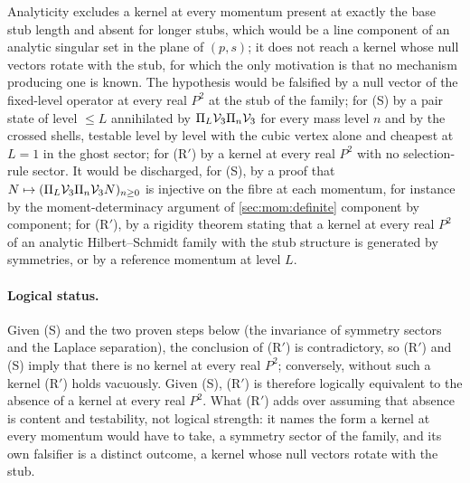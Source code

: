 Analyticity excludes a kernel at every momentum present at exactly the base stub length and absent for longer stubs, which would be a line component of an analytic singular set in the plane of $(p, s)$; it does not reach a kernel whose null vectors rotate with the stub, for which the only motivation is that no mechanism producing one is known.
The hypothesis would be falsified by a null vector of the fixed-level operator at every real $P^2$ at the stub of the family; for (S) by a pair state of level $\le L$ annihilated by $\Pi_L \mathcal{V}_{3} \Pi_n \mathcal{V}_{3}$ for every mass level $n$ and by the crossed shells, testable level by level with the cubic vertex alone and cheapest at $L = 1$ in the ghost sector; for (R$'$) by a kernel at every real $P^2$ with no selection-rule sector.
It would be discharged, for (S), by a proof that $N \mapsto (\Pi_L \mathcal{V}_{3} \Pi_n \mathcal{V}_{3} N)_{n \ge 0}$ is injective on the fibre at each momentum, for instance by the moment-determinacy argument of \cref{sec:mom:definite} component by component; for (R$'$), by a rigidity theorem stating that a kernel at every real $P^2$ of an analytic Hilbert--Schmidt family with the stub structure is generated by symmetries, or by a reference momentum at level $L$.

\paragraph{Logical status.}
Given (S) and the two proven steps below (the invariance of symmetry sectors and the Laplace separation), the conclusion of (R$'$) is contradictory, so (R$'$) and (S) imply that there is no kernel at every real $P^2$; conversely, without such a kernel (R$'$) holds vacuously.
Given (S), (R$'$) is therefore logically equivalent to the absence of a kernel at every real $P^2$.
What (R$'$) adds over assuming that absence is content and testability, not logical strength: it names the form a kernel at every momentum would have to take, a symmetry sector of the family, and its own falsifier is a distinct outcome, a kernel whose null vectors rotate with the stub.

